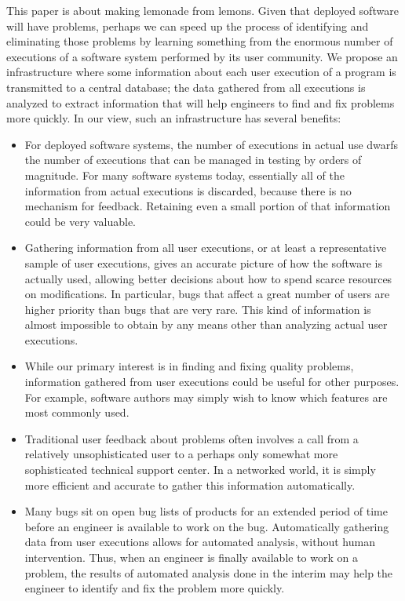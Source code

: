 This paper is about making lemonade from lemons.  Given that deployed
software will have problems, perhaps we can speed up the process of
identifying and eliminating those problems by learning something
from the enormous number of executions of a software system performed
by its user community.  We propose an infrastructure where 
some information about each user execution of a program is 
transmitted to a central database; the data 
gathered from all executions is analyzed to extract information
that will help engineers to find and fix problems more quickly.
In our view, such an infrastructure has several benefits:
\begin{itemize}

\item For deployed software systems, the number of executions
in actual use dwarfs the number of executions that can be managed in
testing by orders of magnitude.  For many software systems today,
essentially all of the information from actual executions is
discarded, because there is no mechanism for feedback.  Retaining
even a small portion of that information could be very valuable.

\item Gathering information from all user executions, or at
least a representative sample of user executions, gives an
accurate picture of how the software is actually used,
allowing better decisions about how to spend scarce resources
on modifications. In particular, bugs that affect a great number
of users are higher priority than bugs that are very rare.
This kind of information is almost impossible to obtain by
any means other than analyzing actual user executions.

\item While our primary interest is in finding and fixing quality
problems, information gathered from user executions could be useful for other purposes.
For example, software authors may simply wish to know which
features are most commonly used.

\item Traditional user feedback about problems often involves a call 
from a relatively unsophisticated user to a perhaps only somewhat
more sophisticated technical support center.  In a networked world,
it is simply more efficient and accurate to gather this information
automatically.

\item Many bugs sit on open bug lists of products for an extended
period of time before an engineer is available to work on the bug.
Automatically gathering data from user executions allows for automated
analysis, without human intervention.  Thus, when an engineer is
finally available to work on a problem, the results of automated
analysis done in the interim may help the engineer to identify and fix
the problem more quickly.


\end{itemize}
